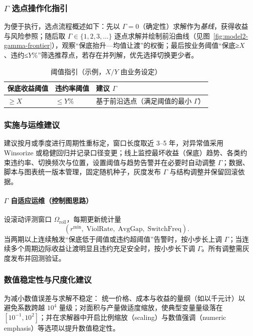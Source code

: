 \subsubsection[Gamma 选点操作化指引]{$\Gamma$ 选点操作化指引}
为便于执行，选点流程概述如下：先以 $\Gamma=0$（确定性）求解作为\emph{基线}，获得收益与风险参照；随后取 $\Gamma\in\{1,2,3,\ldots\}$ 逐点求解并绘制前沿曲线（见图~\ref{fig:model2-gamma-frontier}），观察“保底抬升—均值让渡”的权衡；最后按业务阈值“保底≥$X$、违约≤$Y\%$”筛选推荐点，若存在并列解，优先选择切换更少者。
  \begin{table}[htbp]
    \centering
    \small
  \setlength{\tabcolsep}{3pt}
  \begin{tabular}{@{}>{\raggedright\arraybackslash}p{} >{\raggedright\arraybackslash}p{} >{\raggedright\arraybackslash}p{}@{}}
    \toprule
    保底收益阈值 & 违约率阈值 & 建议 $\Gamma$ \\
    \midrule
    $\ge X$ & $\le Y\%$ & 基于前沿选点（满足阈值的最小 $\Gamma$） \\
    \bottomrule
  \end{tabular}
  \caption{阈值指引（示例，$X/Y$ 由业务设定）}
  \label{tab:model2-gamma-guide}
\end{table}

\subsubsection{实施与运维建议}
建议按月或季度进行周期性重标定，窗口长度取近 3--5 年，对异常值采用 Winsorize 或稳健回归并记录口径变更；线上监控最坏收益（保底）趋势、各类约束违约率、切换频次与位置，设置阈值与趋势告警并在必要时自动调整 $\Gamma$；数据、脚本与图表统一版本管理，固定随机种子，灰度发布 $\Gamma$ 与结构调整并保留回滚依据。

\paragraph{$\Gamma$ 自适应运维（控制图思路）}
设滚动评测窗口 $\Omega_{\text{roll}}$，每期更新统计量
\begin{equation}
  (r^{\min},\;\mathrm{ViolRate},\;\text{AvgGap},\;\text{SwitchFreq}).
\end{equation}
当两期以上连续触发“保底低于阈值或违约超阈值”告警时，按小步长上调 $\Gamma$；当连续多个周期边际收益让渡明显且违约充足安全时，按小步长下调 $\Gamma$。所有调整需灰度发布并回测验证。

\subsubsection{数值稳定性与尺度化建议}
为减小数值误差与求解不稳定：
统一价格、成本与收益的量纲（如以千元计）以避免系数跨越 $10^4$ 量级；对面积与产量做适度缩放，使典型变量量级落在 $[10^{-1},10^{2}]$；并在求解器中开启比例缩放（scaling）与数值强调（numeric emphasis）等选项以提升数值稳定性。

